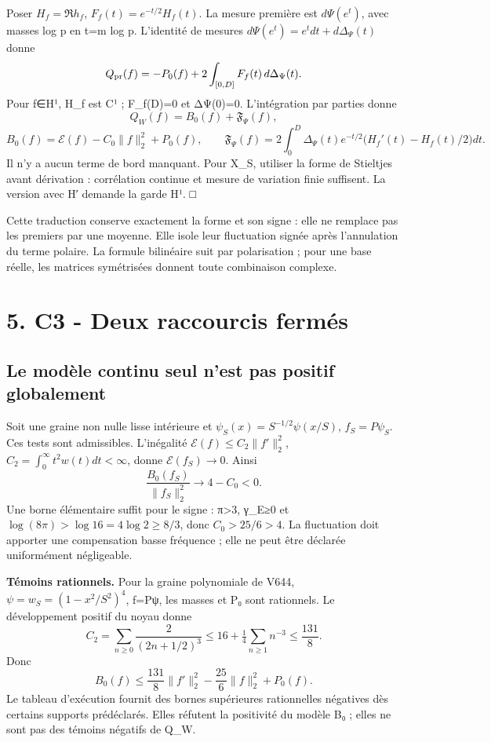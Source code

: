 \documentclass[
  10pt,
  a4paper,
]{article}
\begin{document}
Poser \(H_f=\Re h_f\), \(F_f(t)=e^{-t/2}H_f(t)\). La mesure première est
\(d\Psi(e^t)\), avec masses log p en t=m log p. L'identité de mesures
\(d\Psi(e^t)=e^tdt+d\Delta_\Psi(t)\) donne \[
Q_{\rm pr}(f)=-P_0(f)+2\int_{[0,D]}F_f(t)\,d\Delta_\Psi(t).
\] Pour f∈H¹, H\_f est C¹ ; F\_f(D)=0 et ΔΨ(0)=0. L'intégration par
parties donne \[
\boxed{Q_W(f)=B_0(f)+\mathfrak F_\Psi(f),}
\] \[
B_0(f)=\mathcal E(f)-C_0\|f\|_2^2+P_0(f),\qquad
\mathfrak F_\Psi(f)=2\int_0^D\Delta_\Psi(t)e^{-t/2}
\bigl(H_f'(t)-H_f(t)/2\bigr)dt.
\] Il n'y a aucun terme de bord manquant. Pour X\_S, utiliser la forme
de Stieltjes avant dérivation : corrélation continue et mesure de
variation finie suffisent. La version avec H′ demande la garde H¹. □

Cette traduction conserve exactement la forme et son signe : elle ne
remplace pas les premiers par une moyenne. Elle isole leur fluctuation
signée après l'annulation du terme polaire. La formule bilinéaire suit
par polarisation ; pour une base réelle, les matrices symétrisées
donnent toute combinaison complexe.

\hypertarget{c3---deux-raccourcis-fermuxe9s}{%
\section{5. C3 - Deux raccourcis
fermés}\label{c3---deux-raccourcis-fermuxe9s}}

\hypertarget{le-moduxe8le-continu-seul-nest-pas-positif-globalement}{%
\subsection{Le modèle continu seul n'est pas positif
globalement}\label{le-moduxe8le-continu-seul-nest-pas-positif-globalement}}

Soit une graine non nulle lisse intérieure et
\(\psi_S(x)=S^{-1/2}\psi(x/S)\), \(f_S=P\psi_S\). Ces tests sont
admissibles. L'inégalité \(\mathcal E(f)\le C_2\|f'\|_2^2\),
\(C_2=\int_0^\infty t^2w(t)dt<\infty\), donne \(\mathcal E(f_S)\to0\).
Ainsi \[
\frac{B_0(f_S)}{\|f_S\|_2^2}\longrightarrow4-C_0<0.
\] Une borne élémentaire suffit pour le signe : π\textgreater3, γ\_E≥0
et \(\log(8\pi)>\log16=4\log2\ge8/3\), donc \(C_0>25/6>4\). La
fluctuation doit apporter une compensation basse fréquence ; elle ne
peut être déclarée uniformément négligeable.

\textbf{Témoins rationnels.} Pour la graine polynomiale de V644,
\(\psi=w_S=(1-x^2/S^2)^4\), f=Pψ, les masses et P₀ sont rationnels. Le
développement positif du noyau donne \[
C_2=\sum_{n\ge0}\frac2{(2n+1/2)^3}
\le16+\tfrac14\sum_{n\ge1}n^{-3}\le\frac{131}8.
\] Donc \[
B_0(f)\le\frac{131}8\|f'\|_2^2-\frac{25}6\|f\|_2^2+P_0(f).
\] Le tableau d'exécution fournit des bornes supérieures rationnelles
négatives dès certains supports prédéclarés. Elles réfutent la
positivité du modèle B₀ ; elles ne sont pas des témoins négatifs de
Q\_W.
\end{document}
